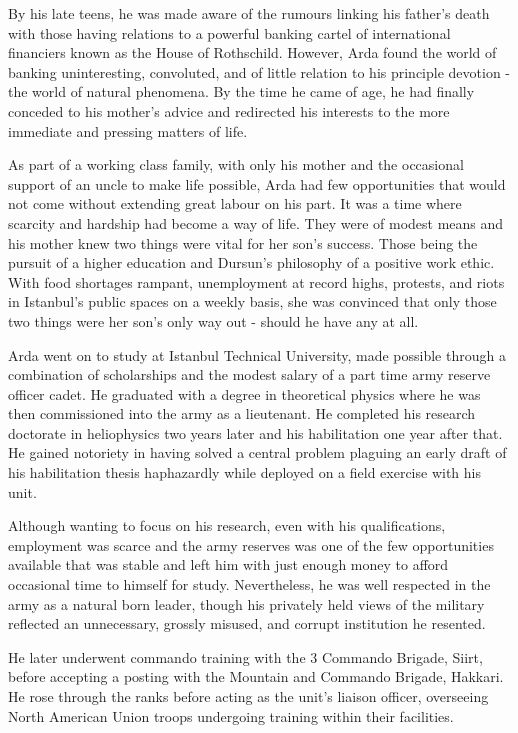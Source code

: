 By his late teens, he was made aware of the rumours linking his father's death with those having relations to a powerful banking cartel of international financiers known as the House of Rothschild. However, Arda found the world of banking uninteresting, convoluted, and of little relation to his principle devotion - the world of natural phenomena. By the time he came of age, he had finally conceded to his mother's advice and redirected his interests to the more immediate and pressing matters of life.

As part of a working class family, with only his mother and the occasional support of an uncle to make life possible, Arda had few opportunities that would not come without extending great labour on his part. It was a time where scarcity and hardship had become a way of life. They were of modest means and his mother knew two things were vital for her son's success. Those being the pursuit of a higher education and Dursun's philosophy of a positive work ethic. With food shortages rampant, unemployment at record highs, protests, and riots in Istanbul's public spaces on a weekly basis, she was convinced that only those two things were her son's only way out - should he have any at all.

Arda went on to study at Istanbul Technical University, made possible through a combination of scholarships and the modest salary of a part time army reserve officer cadet. He graduated with a degree in theoretical physics where he was then commissioned into the army as a lieutenant. He completed his research doctorate in heliophysics two years later and his habilitation one year after that. He gained notoriety in having solved a central problem plaguing an early draft of his habilitation thesis haphazardly while deployed on a field exercise with his unit.

Although wanting to focus on his research, even with his qualifications, employment was scarce and the army reserves was one of the few opportunities available that was stable and left him with just enough money to afford occasional time to himself for study. Nevertheless, he was well respected in the army as a natural born leader, though his privately held views of the military reflected an unnecessary, grossly misused, and corrupt institution he resented.

He later underwent commando training with the 3 Commando Brigade, Siirt, before accepting a posting with the Mountain and Commando Brigade, Hakkari. He rose through the ranks before acting as the unit's liaison officer, overseeing North American Union troops undergoing training within their facilities.

